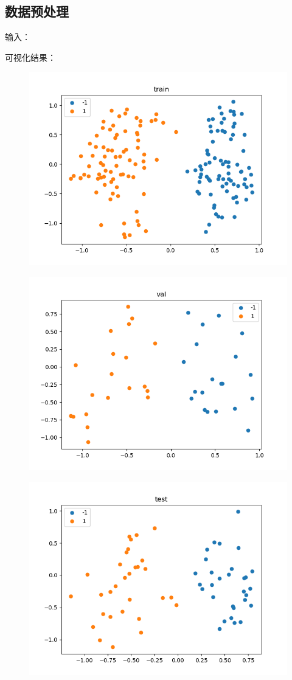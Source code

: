 \documentclass[a4paper]{article}
\begin{document}
\subsection{数据预处理}
输入：

可视化结果：
\begin{figure}[H]
    \centering
    \includegraphics[width=0.6\linewidth]{../../img/pca-train.png}
    \caption{}
\end{figure}
\begin{figure}[H]
    \centering
    \includegraphics[width=0.6\linewidth]{../../img/pca-val.png}
    \caption{}
\end{figure}
\begin{figure}[H]
    \centering
    \includegraphics[width=0.6\linewidth]{../../img/pca-test.png}
    \caption{}
\end{figure}
\end{document}
